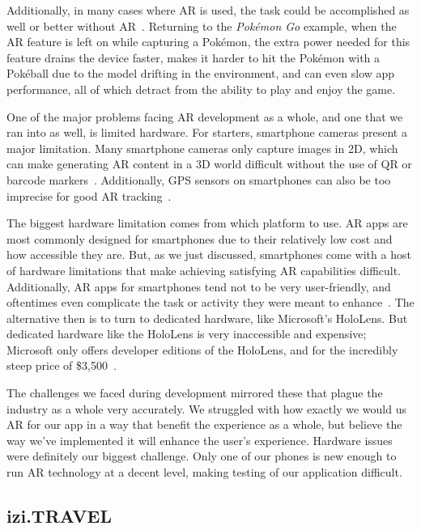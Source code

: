 \documentclass[a4paper, 10pt, american, titlepage]{article}
\begin{document}
Additionally, in many cases where AR is used, the task could be accomplished as
well or better without AR~\autocite{theappsolutions2018}. Returning to the
\textit{Pokémon Go} example, when the AR feature is left on while capturing a
Pokémon, the extra power needed for this feature drains the device faster, makes
it harder to hit the Pokémon with a Pokéball due to the model drifting in the
environment, and can even slow app performance, all of which detract from the
ability to play and enjoy the game.

One of the major problems facing AR development as a whole, and one that we ran
into as well, is limited hardware. For starters, smartphone cameras present a
major limitation. Many smartphone cameras only capture images in 2D, which can
make generating AR content in a 3D world difficult without the use of QR or
barcode markers~\autocite{geospatialworld2018}. Additionally, GPS sensors on
smartphones can also be too imprecise for good AR
tracking~\autocite{geospatialworld2018}.

The biggest hardware limitation comes from which platform to use. AR apps are
most commonly designed for smartphones due to their relatively low cost and how
accessible they are. But, as we just discussed, smartphones come with a host of
hardware limitations that make achieving satisfying AR capabilities difficult.
Additionally, AR apps for smartphones tend not to be very user-friendly, and
oftentimes even complicate the task or activity they were meant to
enhance~\autocite{theappsolutions2018}.  The alternative then is to turn to
dedicated hardware, like Microsoft's HoloLens.  But dedicated hardware like the
HoloLens is very inaccessible and expensive; Microsoft only offers developer
editions of the HoloLens, and for the incredibly steep price of
\$3,500~\autocite{microsoft2019}.

The challenges we faced during development mirrored these that plague the
industry as a whole very accurately. We struggled with how exactly we would us
AR for our app in a way that benefit the experience as a whole, but believe the
way we've implemented it will enhance the user's experience. Hardware issues
were definitely our biggest challenge.  Only one of our phones is new enough to
run AR technology at a decent level, making testing of our application
difficult.

\subsection{izi.TRAVEL}
\label{sec:iziTravel}
\end{document}
